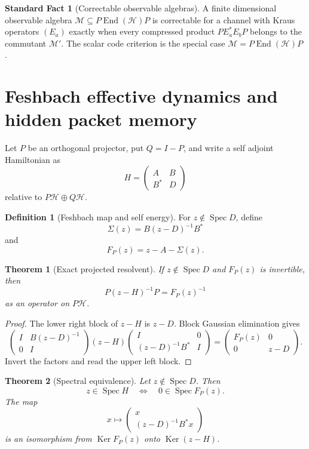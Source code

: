 \documentclass{aomart}
\newtheorem{theorem}{Theorem}[section]
\theoremstyle{definition}
\newtheorem{definition}[definition]{Definition}
\newtheorem{standardfact}[standardfact]{Standard Fact}
\theoremstyle{remark}
\newcommand{\Hcal}{\mathcal H}
\newcommand{\Mcal}{\mathcal M}
\newcommand{\End}{\operatorname{End}}
\newcommand{\Ker}{\operatorname{Ker}}
\newcommand{\Spec}{\operatorname{Spec}}
\begin{document}
\begin{standardfact}[Correctable observable algebras]\label{fact:operator_qec}
A finite dimensional observable algebra \(\Mcal\subseteq P\End(\Hcal)P\) is correctable for a channel with Kraus operators \((E_a)\) exactly when every compressed product \(PE_a^*E_bP\) belongs to the commutant \(\Mcal'\). The scalar code criterion is the special case \(\Mcal=P\End(\Hcal)P\) \cite{BenyKempfKribs2007}.
\end{standardfact}

\section{Feshbach effective dynamics and hidden packet memory}\label{sec:feshbach}

Let \(P\) be an orthogonal projector, put \(Q=I-P\), and write a self adjoint Hamiltonian as
\[
H=
\begin{pmatrix}
A&B\\
B^*&D
\end{pmatrix}
\]
relative to \(P\Hcal\oplus Q\Hcal\).

\begin{definition}[Feshbach map and self energy]\label{def:feshbach_map}
For \(z\notin\Spec D\), define
\[
\Sigma(z)=B(z-D)^{-1}B^*
\]
and
\[
F_P(z)=z-A-\Sigma(z).
\]
\end{definition}

\begin{theorem}[Exact projected resolvent]\label{thm:feshbach_resolvent}
If \(z\notin\Spec D\) and \(F_P(z)\) is invertible, then
\[
P(z-H)^{-1}P=F_P(z)^{-1}
\]
as an operator on \(P\Hcal\).
\end{theorem}

\begin{proof}
The lower right block of \(z-H\) is \(z-D\). Block Gaussian elimination gives
\[
\begin{pmatrix}
I&B(z-D)^{-1}\\
0&I
\end{pmatrix}
(z-H)
\begin{pmatrix}
I&0\\
(z-D)^{-1}B^*&I
\end{pmatrix}
=
\begin{pmatrix}
F_P(z)&0\\
0&z-D
\end{pmatrix}.
\]
Invert the factors and read the upper left block.
\end{proof}

\begin{theorem}[Spectral equivalence]\label{thm:feshbach_spectrum}
Let \(z\notin\Spec D\). Then
\[
z\in\Spec H
\quad\Longleftrightarrow\quad
0\in\Spec F_P(z).
\]
The map
\[
x\longmapsto
\begin{pmatrix}
x\\
(z-D)^{-1}B^*x
\end{pmatrix}
\]
is an isomorphism from \(\Ker F_P(z)\) onto \(\Ker(z-H)\).
\end{theorem}
\end{document}
